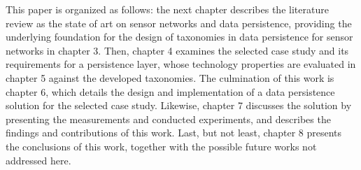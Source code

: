 This paper is organized as follows: the next chapter describes the literature
review as the state of art on sensor networks and data persistence, providing
the underlying foundation for the design of taxonomies in data persistence for
sensor networks in chapter 3. Then, chapter 4 examines the selected case study
and its requirements for a persistence layer, whose technology properties are
evaluated in chapter 5 against the developed taxonomies. The culmination of
this work is chapter 6, which details the design and implementation of a data
persistence solution for the selected case study. Likewise, chapter 7 discusses
the solution by presenting the measurements and conducted experiments, and
describes the findings and contributions of this work. Last, but not least,
chapter 8 presents the conclusions of this work, together with the possible
future works not addressed here.
